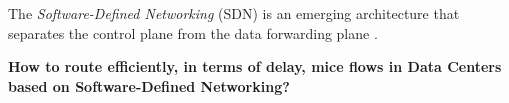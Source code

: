 The \emph{Software-Defined Networking} (SDN) is an emerging architecture \cite{2} that separates the control plane from the data forwarding plane \cite{5}.


\begin{center}
    \textbf{How to route efficiently, in terms of delay, mice flows in Data Centers based on Software-Defined Networking?}
\end{center}